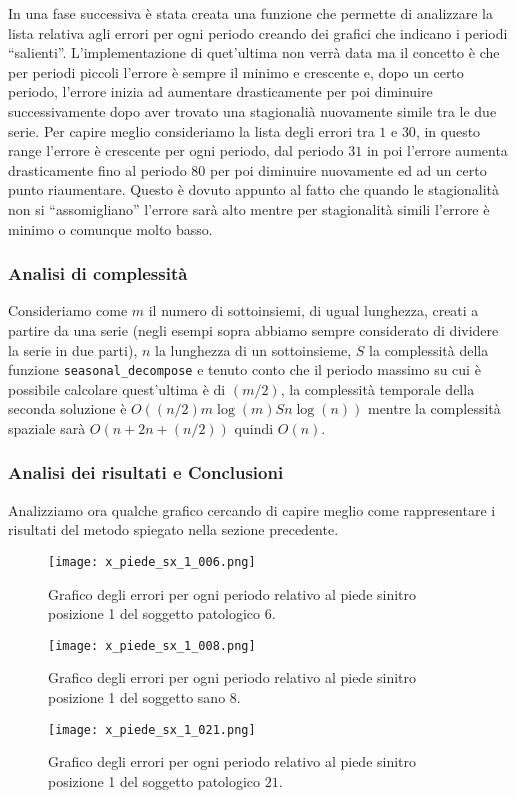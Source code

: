 In una fase successiva è stata creata una funzione che permette di analizzare la lista relativa
agli errori per ogni periodo creando dei grafici che indicano i periodi ``salienti''. 
L'implementazione di quet'ultima non verrà data ma il concetto è che per periodi piccoli l'errore
è sempre il minimo e crescente e, dopo un certo periodo, l'errore inizia ad aumentare drasticamente
per poi diminuire successivamente dopo aver trovato una stagionalià nuovamente simile tra le due serie.
Per capire meglio consideriamo la lista degli errori tra $1$ e $30$, in questo range l'errore è crescente
per ogni periodo, dal periodo $31$ in poi l'errore aumenta drasticamente fino al periodo $80$ per poi diminuire
nuovamente ed ad un certo punto riaumentare. Questo è dovuto appunto al fatto che quando le stagionalità non si
``assomigliano'' l'errore sarà alto mentre per stagionalità simili l'errore è minimo o comunque molto basso.

\subsubsection{Analisi di complessità}
Consideriamo come $m$ il numero di sottoinsiemi, di ugual lunghezza, creati a partire da una serie 
(negli esempi sopra abbiamo sempre considerato di dividere la serie in due parti),
$n$ la lunghezza di un sottoinsieme, $S$ la complessità della 
funzione \texttt{seasonal\_decompose} e tenuto conto che il periodo massimo su cui è possibile
calcolare quest'ultima è di $(m/2)$, la complessità temporale della seconda soluzione è 
$O( (n/2)m\log{(m)}Sn\log{(n)} )$ mentre la complessità spaziale sarà $O( n+2n+(n/2) )$ quindi $O(n)$.


\subsubsection{Analisi dei risultati e Conclusioni}
Analizziamo ora qualche grafico cercando di capire meglio come rappresentare i risultati del metodo
spiegato nella sezione precedente.
\begin{figure}[H]
    \centering
    \texttt{[image: x\_piede\_sx\_1\_006.png]}
    \caption{Grafico degli errori per ogni periodo relativo al piede sinitro posizione 1 del soggetto patologico $6$.}
    \label{fig:x_piede_sx_1_006_m2}
\end{figure}
\begin{figure}[H]
    \centering
    \texttt{[image: x\_piede\_sx\_1\_008.png]}
    \caption{Grafico degli errori per ogni periodo relativo al piede sinitro posizione 1 del soggetto sano $8$.}
    \label{fig:x_piede_sx_1_008_m2}
\end{figure}
\begin{figure}[H]
    \centering
    \texttt{[image: x\_piede\_sx\_1\_021.png]}
    \caption{Grafico degli errori per ogni periodo relativo al piede sinitro posizione 1 del soggetto patologico $21$.}
    \label{fig:x_piede_sx_1_021_m2}
\end{figure}

